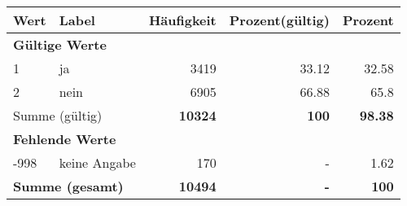      \begin{longtable}{lXrrr}
     \toprule
     \textbf{Wert} & \textbf{Label} & \textbf{Häufigkeit} & \textbf{Prozent(gültig)} & \textbf{Prozent} \\
     \endhead
     \midrule
     \multicolumn{5}{l}{\textbf{Gültige Werte}}\\

     1 &
     \multicolumn{1}{X}{ ja   } &


       \num{3419} &
       \num[round-mode=places,round-precision=2]{33.12} &
         \num[round-mode=places,round-precision=2]{32.58} \\

     2 &
     \multicolumn{1}{X}{ nein   } &


       \num{6905} &
       \num[round-mode=places,round-precision=2]{66.88} &
         \num[round-mode=places,round-precision=2]{65.8} \\
     \midrule
     \multicolumn{2}{l}{Summe (gültig)} &
       \textbf{\num{10324}} &
     \textbf{\num{100}} &
       \textbf{\num[round-mode=places,round-precision=2]{98.38}} \\
     \multicolumn{5}{l}{\textbf{Fehlende Werte}}\\
       -998 &
       keine Angabe &
         \num{170} &
        - &
         \num[round-mode=places,round-precision=2]{1.62} \\
     \midrule
     \multicolumn{2}{l}{\textbf{Summe (gesamt)}} &
          \textbf{\num{10494}} &
        \textbf{-} &
        \textbf{\num{100}} \\
     \bottomrule
     \end{longtable}
     
